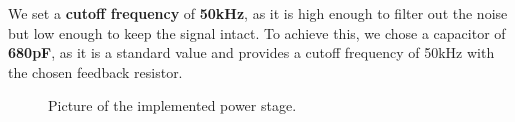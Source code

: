 We set a \textbf{cutoff frequency} of \textbf{50kHz}, as it is high enough to filter out the noise but low enough to keep the signal intact.
To achieve this, we chose a capacitor of \textbf{680pF}, as it is a standard value and provides a cutoff frequency of 50kHz with the chosen feedback resistor.

\begin{figure}[H]
    \centering
    \caption{Picture of the implemented power stage.}
    \label{fig:IRL_power_stage}
\end{figure}
